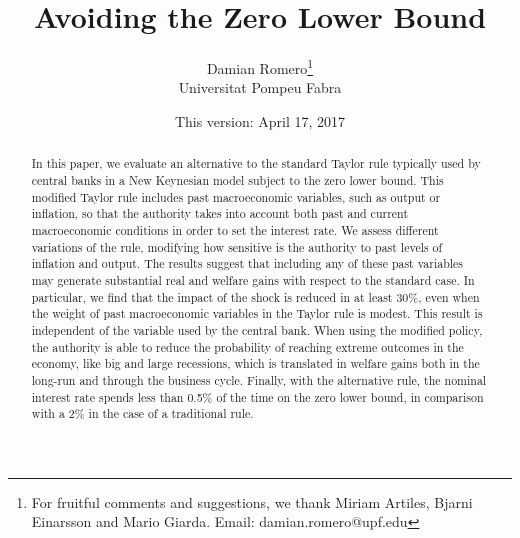 \documentclass[12pt]{article}
\title{Avoiding the Zero Lower Bound}
\author{Damian Romero\thanks{For fruitful comments and suggestions, we thank Miriam Artiles, Bjarni Einarsson and Mario Giarda. Email: damian.romero@upf.edu}\\Universitat Pompeu Fabra}
\date{This version: April 17, 2017}
\numberwithin{equation}{section}
\begin{document}
	
\maketitle

\begin{abstract}
\noindent In this paper, we evaluate an alternative to the standard Taylor rule typically used by central banks in a New Keynesian model subject to the zero lower bound. This modified Taylor rule includes past macroeconomic variables, such as output or inflation, so that the authority takes into account both past and current macroeconomic conditions in order to set the interest rate. We assess different variations of the rule, modifying how sensitive is the authority to past levels of inflation and output. The results suggest that including any of these past variables may generate substantial real and welfare gains with respect to the standard case. In particular, we find that the impact of the shock is reduced in at least 30\%, even when the weight of past macroeconomic variables in the Taylor rule is modest. This result is independent of the variable used by the central bank. When using the modified policy, the authority is able to reduce the probability of reaching extreme outcomes in the economy, like big and large recessions, which is translated in welfare gains both in the long-run and through the business cycle. Finally, with the alternative rule, the nominal interest rate spends less than 0.5\% of the time on the zero lower bound, in comparison with a 2\% in the case of a traditional rule.
\end{abstract}	
\end{document}
